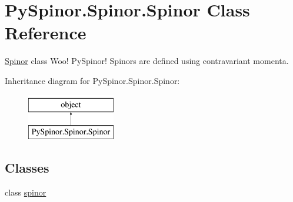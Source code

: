 \hypertarget{class_py_spinor_1_1_spinor_1_1_spinor}{}\section{Py\+Spinor.\+Spinor.\+Spinor Class Reference}
\label{class_py_spinor_1_1_spinor_1_1_spinor}


\hyperlink{class_py_spinor_1_1_spinor_1_1_spinor}{Spinor} class Woo! Py\+Spinor! Spinors are defined using contravariant momenta.  


Inheritance diagram for Py\+Spinor.\+Spinor.\+Spinor\+:\begin{figure}[H]
\begin{center}
\leavevmode
\includegraphics[height=2.000000cm]{class_py_spinor_1_1_spinor_1_1_spinor}
\end{center}
\end{figure}
\subsection*{Classes}
\begin{DoxyCompactItemize}
\item 
class \hyperlink{class_py_spinor_1_1_spinor_1_1_spinor_1_1spinor}{spinor}
\end{DoxyCompactItemize}
